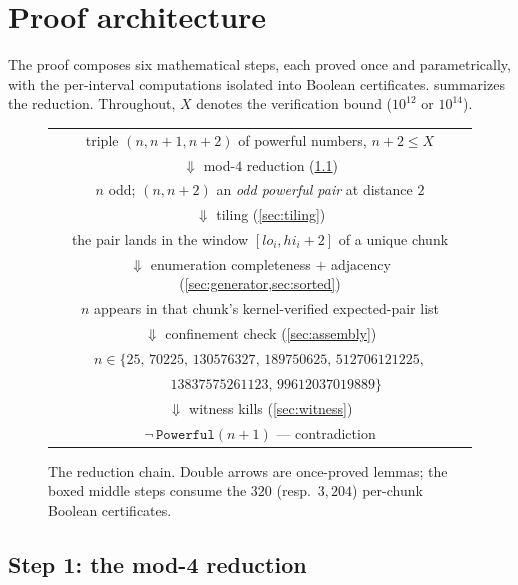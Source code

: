 \documentclass[11pt]{article}
\theoremstyle{definition}
\theoremstyle{remark}
\newcommand{\code}[1]{\texttt{#1}}
\newcommand{\Powerful}{\code{Powerful}}
\begin{document}
\section{Proof architecture}\label{sec:architecture}

The proof composes six mathematical steps, each proved once and
parametrically, with the per-interval computations isolated into Boolean
certificates.  summarizes the reduction. Throughout,
$X$ denotes the verification bound ($10^{12}$ or $10^{14}$).

\begin{figure}[t]
\centering
\begin{tabular}{c}
triple $(n,n{+}1,n{+}2)$ of powerful numbers, $n+2 \le X$ \\[2pt]
$\Downarrow$ {\small mod-$4$ reduction (\cref{sec:mod4})} \\[2pt]
$n$ odd; $(n, n{+}2)$ an \emph{odd powerful pair} at distance $2$ \\[2pt]
$\Downarrow$ {\small tiling (\cref{sec:tiling})} \\[2pt]
the pair lands in the window $[lo_i, hi_i{+}2]$ of a unique chunk \\[2pt]
$\Downarrow$ {\small enumeration completeness $+$ adjacency (\cref{sec:generator,sec:sorted})} \\[2pt]
$n$ appears in that chunk's kernel-verified expected-pair list \\[2pt]
$\Downarrow$ {\small confinement check (\cref{sec:assembly})} \\[2pt]
$n \in \{25,\, 70225,\, 130576327,\, 189750625,\, 512706121225,$ \\
$\phantom{n \in \{} 13837575261123,\, 99612037019889\}$ \\[2pt]
$\Downarrow$ {\small witness kills (\cref{sec:witness})} \\[2pt]
$\lnot\,\Powerful(n{+}1)$ --- contradiction
\end{tabular}
\caption{The reduction chain. Double arrows are once-proved lemmas;
the boxed middle steps consume the $320$ (resp.\ $3{,}204$)
per-chunk Boolean certificates.}
\label{fig:pipeline}
\end{figure}

\subsection{Step 1: the mod-4 reduction}\label{sec:mod4}
\end{document}
